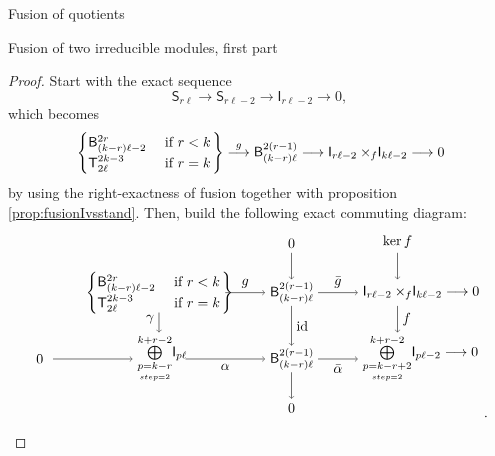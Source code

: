 \documentclass[reqno]{amsart}
\newcommand{\ds}[1]{\mathsf S_{#1}}
\newcommand{\dl}[1]{\mathsf I_{#1}}
\newcommand{\xf}{\times\hspace{-0.27em}_f}
\newcommand{\T}[2]{\mathsf{T}^{#1}_{#2}}
\newcommand{\B}[2]{\mathsf{B}^{#1}_{#2}}
\newcommand{\lc}{\ell}
\DeclareMathOperator{\id}{id}
\begin{document}
\begin{section}{Fusion of quotients}
\begin{subsection}{Fusion of two irreducible modules, first part}
\begin{proof}
Start with the exact sequence
\begin{equation}
\ds{r \lc} \longrightarrow \ds{r \lc -2} \longrightarrow \dl{r \lc -2} \longrightarrow 0,
\end{equation}
which becomes
\begin{equation}
\left.\begin{cases}
\B{2 r}{(k-r)\lc -2} & \text{ if } r<k\\
\T{2k-3}{2\lc} & \text{ if } r=k
\end{cases}\right\} \overset{g}{\longrightarrow} \B{2(r-1)}{(k-r)\lc} \longrightarrow \dl{r \lc -2}\xf \dl{k \lc -2} \longrightarrow 0
\end{equation}
by using the right-exactness of fusion together with proposition \ref{prop:fusionIvsstand}. Then, build the following exact commuting diagram:
\begin{equation}
\begin{tikzpicture}[scale=1/3]
	\node[anchor = west] at (3,0) {$\left.\begin{cases}
\B{2 r}{(k-r)\lc -2} & \text{ if } r<k\\
\T{2k-3}{2\lc} & \text{ if } r=k
\end{cases}\right\}$};
	\draw[->] (14,0) -- (17,0);
		\node[anchor = south] at (15.5,0) {$g$};
		\node[anchor=west] at (17,0) {$\B{2(r-1)}{(k-r)\lc}$};
	\draw[->] (21,0) -- (24,0);
		\node[anchor=south] at (22.5,0) {$\bar{g}$};
		\node[anchor=west] at (24,0) {$\dl{r \lc -2}\xf \dl{k \lc -2} \longrightarrow 0$};
%
		\node at (0,-5) {$0$};
	\draw[->] (1,-5) -- (7,-5);
		\node[anchor=west] at (7,-5) {$\overset{k+r-2}{\underset{\underset{step=2}{p=k-r}}{\bigoplus}}\dl{p \lc }$};
	\draw[->] (11,-5) -- (17,-5);
		\node[anchor=north] at (14,-5) {$\alpha$};
		\node[anchor=west] at (17,-5) {$\B{2(r-1)}{(k-r)\lc}$};
	\draw[->] (21,-5) -- (24,-5);
		\node[anchor=north] at (22.5,-5) {$\bar{\alpha}$};
		\node[anchor=west] at (24,-5) {$\overset{k+r-2}{\underset{\underset{step=2}{p=k-r+2}}{\bigoplus}}\dl{p \lc -2} \longrightarrow 0$};
%
	\draw[->] (9,-1.5)--(9,-3);
		\node[anchor=east] at (9,-2) {$\gamma $};
	\draw[->] (19,-1) -- (19,-4);
		\node[anchor=west] at (19,-2.5) {$\id $};
	\draw[->] (27,-1)--(27,-3);
		\node[anchor=west]at (27,-2) {$f $};
%
	\draw[->] (19,3) -- (19,1);
		\node[anchor=south] at (19,3) {$0$};
	\draw[->] (27,3) -- (27,1);
		\node[anchor=south] at (27,3) {$\ker f $};
	\draw[->] (19,-6) -- (19,-8);
		\node[anchor=north] at (19,-8) {$0$};
\end{tikzpicture}.
\end{equation}

\end{proof}
\end{subsection}
\end{section}
\end{document}
